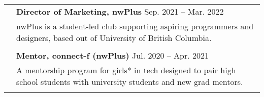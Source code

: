 \documentclass[letterpaper, 11pt]{article}
\begin{document}
\begin{longtable}{p{1.3in}p{4.8in}}
& \textbf{Director of Marketing, nwPlus} \hfill Sep. 2021 -- Mar. 2022 \\
& nwPlus is a student-led club supporting aspiring programmers and designers, based out of University of British Columbia. \\
& \\

& \textbf{Mentor, connect-f (nwPlus)} \hfill Jul. 2020 -- Apr. 2021 \\
& A mentorship program for girls* in tech designed to pair high school students with university students and new grad mentors.  \\
& \\


\end{longtable}
\end{document}
